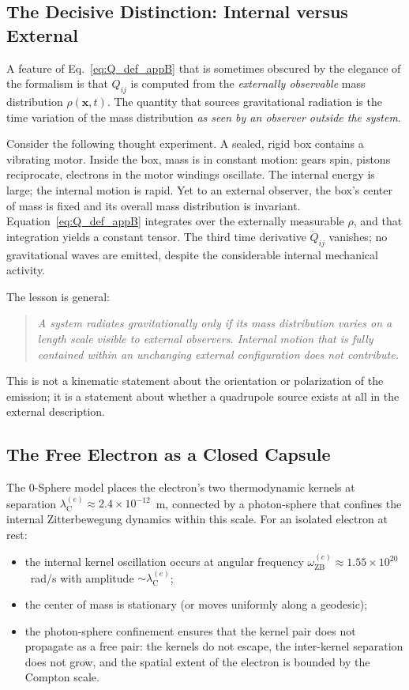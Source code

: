 \documentclass[%
 reprint, amsmath,amssymb, aps, prd, ]{revtex4-2}
\numberwithin{equation}{section}
\newcommand{\lambdaCe}{\lambda_{\mathrm{C}}^{(e)}}
\newcommand{\omZBe}{\omega_{\mathrm{ZB}}^{(e)}}
\begin{document}
\subsection{The Decisive Distinction: Internal versus External}

A feature of Eq.~\eqref{eq:Q_def_appB} that is sometimes obscured by the elegance of the formalism is that $Q_{ij}$ is computed from the \emph{externally observable} mass distribution $\rho(\bm{x}, t)$.
The quantity that sources gravitational radiation is the time variation of the mass distribution \emph{as seen by an observer outside the system}.

Consider the following thought experiment.
A sealed, rigid box contains a vibrating motor.
Inside the box, mass is in constant motion: gears spin, pistons reciprocate, electrons in the motor windings oscillate.
The internal energy is large; the internal motion is rapid.
Yet to an external observer, the box's center of mass is fixed and its overall mass distribution is invariant.
Equation~\eqref{eq:Q_def_appB} integrates over the externally measurable $\rho$, and that integration yields a constant tensor.
The third time derivative $\dddot{Q}_{ij}$ vanishes; no gravitational waves are emitted, despite the considerable internal mechanical activity.

The lesson is general:
\begin{quote}
\emph{A system radiates gravitationally only if its mass distribution varies on a length scale visible to external observers.
Internal motion that is fully contained within an unchanging external configuration does not contribute.}
\end{quote}
This is not a kinematic statement about the orientation or polarization of the emission; it is a statement about whether a quadrupole source exists at all in the external description.

\subsection{The Free Electron as a Closed Capsule}

The 0-Sphere model places the electron's two thermodynamic kernels at separation $\lambdaCe \approx 2.4 \times 10^{-12}$~m, connected by a photon-sphere that confines the internal Zitterbewegung dynamics within this scale.
For an isolated electron at rest:
\begin{itemize}[leftmargin=2em, itemsep=4pt]
\item the internal kernel oscillation occurs at angular frequency $\omZBe \approx 1.55 \times 10^{20}$~rad/s with amplitude $\sim \lambdaCe$;
\item the center of mass is stationary (or moves uniformly along a geodesic);
\item the photon-sphere confinement ensures that the kernel pair does not propagate as a free pair: the kernels do not escape, the inter-kernel separation does not grow, and the spatial extent of the electron is bounded by the Compton scale.
\end{itemize}
\end{document}
